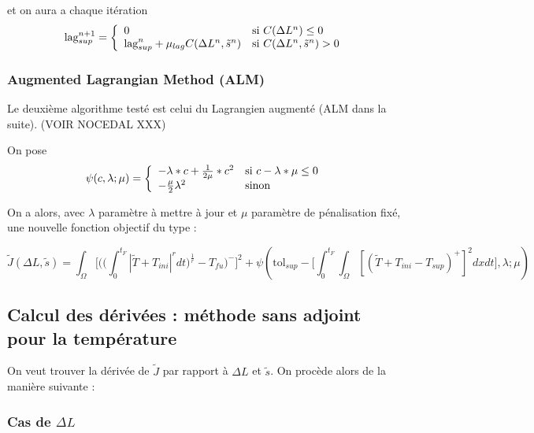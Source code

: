 \documentclass[11pt,a4paper]{article}
\begin{document}
et on aura a chaque itération 
\begin{equation}
\textrm{lag}_{sup}^{n+1}=\left\{
\begin{array}{ll}
0 & \textrm{si\,\,}C(\Delta L^n)\leq0 \\
\textrm{lag}_{sup}^n+\mu_{lag}C(\Delta L^n,\tilde{s}^n) & \textrm{si\,\,}C(\Delta L^n,\tilde{s}^n)>0
\end{array}
\right.
\end{equation}

\subsubsection*{Augmented Lagrangian Method (ALM)}

Le deuxième algorithme testé est celui du Lagrangien augmenté (ALM dans la suite). (VOIR NOCEDAL XXX)

On pose 
\begin{equation}
\psi(c,\lambda;\mu)=\left\{\begin{array}{ll}
-\lambda*c+\frac{1}{2\mu}*c^2 & \textrm{si\,\,}c-\lambda*\mu\leq 0\\
-\frac{\mu}{2}\lambda^2 & \textrm{sinon}
\end{array}\right.
\end{equation}

On a alors, avec $\lambda$ paramètre à mettre à jour et $\mu$ paramètre de pénalisation fixé, une nouvelle fonction objectif du type :

\begin{equation}
\tilde{J}(\Delta L,\tilde{s})=\int_{\Omega}\Bigg[\Bigg(\Big(\int_{0}^{t_F}|\tilde{T}+T_{ini}|^rdt\Big)^{\frac{1}{r}}-T_{fu}\Bigg)^-\Bigg]^2+\psi\left(\textrm{tol}_{sup}-\Bigg[\int_{0}^{t_F}\int_{\Omega}[(\tilde{T}+T_{ini}-T_{sup})^+]^2dxdt\Bigg],\lambda;\mu\right)
\end{equation}




\subsection*{Calcul des dérivées : méthode sans adjoint pour la température}


On veut trouver la dérivée de $\tilde{J}$ par rapport à $\Delta L$ et $\tilde{s}$. On procède alors de la manière suivante :

\subsubsection*{Cas de $\Delta L$}
\end{document}
